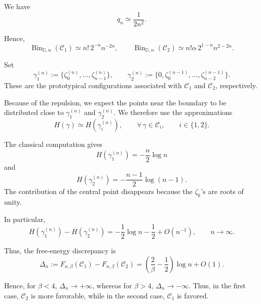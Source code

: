\documentclass{article}
\newcommand{\Bin}{\operatorname{Bin}}
\begin{document}
We have
\[
q_n
\simeq
\frac{1}{2n^2}.
\]

Hence,
\[
\Bin_{\mathbb{D},n}(\mathcal{C}_1)
\simeq
n!\,2^{-n}n^{-2n},
\qquad
\Bin_{\mathbb{D},n}(\mathcal{C}_2)
\simeq
n!\alpha \,2^{1-n}n^{2-2n}.
\]

Set
\[
\gamma_1^{(n)}
:=
\{\zeta_0^{(n)},\ldots,\zeta_{n-1}^{(n)}\},
\qquad
\gamma_2^{(n)}
:=
\{0,\zeta_0^{(n-1)},\ldots,\zeta_{n-2}^{(n-1)}\}.
\]
These are the prototypical configurations associated with $\mathcal{C}_1$ and $\mathcal{C}_2$, respectively.

Because of the repulsion, we expect the points near the boundary to be distributed close to $\gamma_1^{(n)}$ and $\gamma_2^{(n)}$. We therefore use the approximations
\[
H(\gamma)
\simeq
H(\gamma_i^{(n)}),
\qquad
\forall\,\gamma\in\mathcal{C}_i,
\qquad
i\in\{1,2\}.
\]

The classical computation gives
\[
H(\gamma_1^{(n)})
=
-\frac{n}{2}\log n
\]
and
\[
H(\gamma_2^{(n)})
=
-\frac{n-1}{2}\log(n-1).
\]
The contribution of the central point disappears because the $\zeta_k$'s are roots of unity.

In particular,
\[
H(\gamma_1^{(n)})-H(\gamma_2^{(n)})
=
-\frac{1}{2}\log n-\frac{1}{2}+O(n^{-1}),
\qquad
n\to\infty.
\]

Thus, the free-energy discrepancy is
\[
\Delta_n
:=
F_{n,\beta}(\mathcal{C}_1)
-
F_{n,\beta}(\mathcal{C}_2)
=
\left(\frac{2}{\beta}-\frac{1}{2}\right)\log n
+O(1).
\]

Hence, for $\beta<4$, $\Delta_n\to+\infty$, whereas for $\beta>4$, $\Delta_n\to-\infty$. Thus, in the first case, $\mathcal{C}_2$ is more favorable, while in the second case, $\mathcal{C}_1$ is favored.
\end{document}
